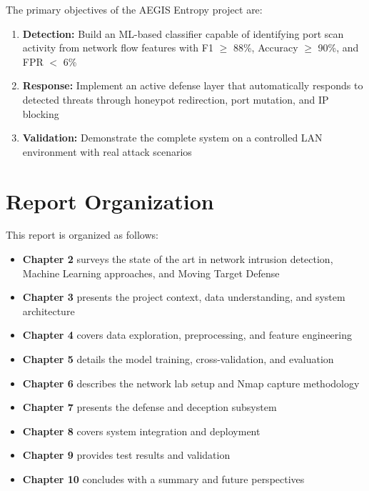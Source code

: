 The primary objectives of the AEGIS Entropy project are:

\begin{enumerate}
    \item \textbf{Detection:} Build an ML-based classifier capable of identifying port scan activity from network flow features with F1 $\geq$ 88\%, Accuracy $\geq$ 90\%, and FPR $<$ 6\%
    \item \textbf{Response:} Implement an active defense layer that automatically responds to detected threats through honeypot redirection, port mutation, and IP blocking
    \item \textbf{Validation:} Demonstrate the complete system on a controlled LAN environment with real attack scenarios
\end{enumerate}

\section{Report Organization}

This report is organized as follows:

\begin{itemize}
    \item \textbf{Chapter 2} surveys the state of the art in network intrusion detection, Machine Learning approaches, and Moving Target Defense
    \item \textbf{Chapter 3} presents the project context, data understanding, and system architecture
    \item \textbf{Chapter 4} covers data exploration, preprocessing, and feature engineering
    \item \textbf{Chapter 5} details the model training, cross-validation, and evaluation
    \item \textbf{Chapter 6} describes the network lab setup and Nmap capture methodology
    \item \textbf{Chapter 7} presents the defense and deception subsystem
    \item \textbf{Chapter 8} covers system integration and deployment
    \item \textbf{Chapter 9} provides test results and validation
    \item \textbf{Chapter 10} concludes with a summary and future perspectives
\end{itemize}
